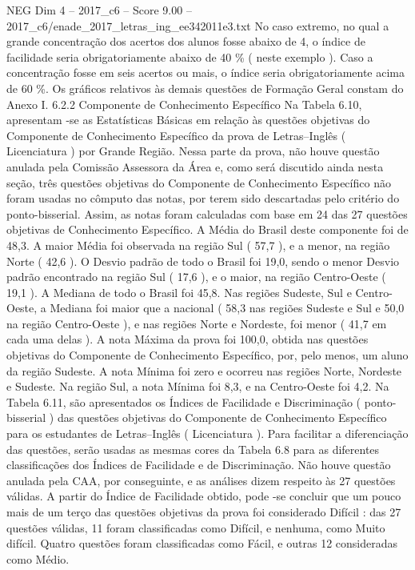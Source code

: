 \begin{textsample}{NEG Dim 4 – 2017\_c6 – Score 9.00 – 2017\_c6/enade\_2017\_letras\_ing\_ee342011e3.txt}
No caso extremo, no qual a grande concentração dos acertos dos alunos fosse abaixo de 4, o índice de facilidade seria obrigatoriamente abaixo de 40 \% ( neste exemplo ).
Caso a concentração fosse em seis acertos ou mais, o índice seria obrigatoriamente acima de 60 \%.
Os gráficos relativos às demais questões de Formação Geral constam do Anexo I. 6.2.2 Componente de Conhecimento Específico Na Tabela 6.10, apresentam -se as Estatísticas Básicas em relação às questões objetivas do Componente de Conhecimento Específico da prova de Letras–Inglês ( Licenciatura ) por Grande Região.
Nessa parte da prova, não houve questão anulada pela Comissão Assessora da Área e, como será discutido ainda nesta seção, três questões objetivas do Componente de Conhecimento Específico não foram usadas no cômputo das notas, por terem sido descartadas pelo critério do ponto-bisserial.
Assim, as notas foram calculadas com base em 24 das 27 questões objetivas de Conhecimento Específico.
A Média do Brasil deste componente foi de 48,3.
A maior Média foi observada na região Sul ( 57,7 ), e a menor, na região Norte ( 42,6 ).
O Desvio padrão de todo o Brasil foi 19,0, sendo o menor Desvio padrão encontrado na região Sul ( 17,6 ), e o maior, na região Centro-Oeste ( 19,1 ).
A Mediana de todo o Brasil foi 45,8.
Nas regiões Sudeste, Sul e Centro-Oeste, a Mediana foi maior que a nacional ( 58,3 nas regiões Sudeste e Sul e 50,0 na região Centro-Oeste ), e nas regiões Norte e Nordeste, foi menor ( 41,7 em cada uma delas ).
A nota Máxima da prova foi 100,0, obtida nas questões objetivas do Componente de Conhecimento Específico, por, pelo menos, um aluno da região Sudeste.
A nota Mínima foi zero e ocorreu nas regiões Norte, Nordeste e Sudeste.
Na região Sul, a nota Mínima foi 8,3, e na Centro-Oeste foi 4,2.
Na Tabela 6.11, são apresentados os Índices de Facilidade e Discriminação ( ponto-bisserial ) das questões objetivas do Componente de Conhecimento Específico para os estudantes de Letras–Inglês ( Licenciatura ).
Para facilitar a diferenciação das questões, serão usadas as mesmas cores da Tabela 6.8 para as diferentes classificações dos Índices de Facilidade e de Discriminação.
Não houve questão anulada pela CAA, por conseguinte, e as análises dizem respeito às 27 questões válidas.
A partir do Índice de Facilidade obtido, pode -se concluir que um pouco mais de um terço das questões objetivas da prova foi considerado Difícil : das 27 questões válidas, 11 foram classificadas como Difícil, e nenhuma, como Muito difícil.
Quatro questões foram classificadas como Fácil, e outras 12 consideradas como Médio.

\end{textsample}
